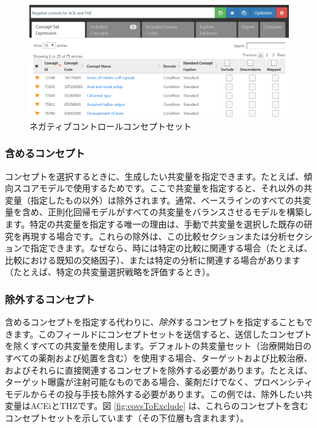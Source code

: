 \documentclass[
  11pt]{book}
\theoremstyle{definition}
\theoremstyle{definition}
\theoremstyle{definition}
\theoremstyle{definition}
\theoremstyle{remark}
\begin{document}
\begin{figure}

{\centering \includegraphics[width=1\linewidth]{images/PopulationLevelEstimation/ncConceptSet} 

}

\caption{ネガティブコントロールコンセプトセット}\label{fig:ncConceptSet}
\end{figure}

\subsubsection*{含めるコンセプト}\label{ux542bux3081ux308bux30b3ux30f3ux30bbux30d7ux30c8}

コンセプトを選択するときに、生成したい共変量を指定できます。たとえば、傾向スコアモデルで使用するためです。ここで共変量を指定すると、それ以外の共変量（指定したもの以外）は除外されます。通常、ベースラインのすべての共変量を含め、正則化回帰モデルがすべての共変量をバランスさせるモデルを構築します。特定の共変量を指定する唯一の理由は、手動で共変量を選択した既存の研究を再現する場合です。これらの除外は、この比較セクションまたは分析セクションで指定できます。なぜなら、時には特定の比較に関連する場合（たとえば、比較における既知の交絡因子）、または特定の分析に関連する場合があります（たとえば、特定の共変量選択戦略を評価するとき）。

\subsubsection*{除外するコンセプト}\label{ux9664ux5916ux3059ux308bux30b3ux30f3ux30bbux30d7ux30c8}

含めるコンセプトを指定する代わりに、\emph{除外}するコンセプトを指定することもできます。このフィールドにコンセプトセットを送信すると、送信したコンセプトを除くすべての共変量を使用します。デフォルトの共変量セット（治療開始日のすべての薬剤および処置を含む）を使用する場合、ターゲットおよび比較治療、およびそれらに直接関連するコンセプトを除外する必要があります。たとえば、ターゲット曝露が注射可能なものである場合、薬剤だけでなく、プロペンシティモデルからその投与手技も除外する必要があります。この例では、除外したい共変量はACEiとTHZです。図 \ref{fig:covsToExclude} は、これらのコンセプトを含むコンセプトセットを示しています（その下位層も含まれます）。
\end{document}
